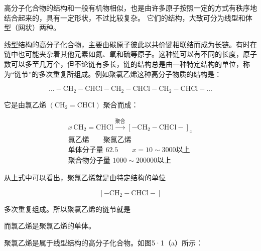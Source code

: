 高分子化合物的结构和一般有机物相似，也是由许多原子按照一定的方式有秩序地结合起来的，具有一定形状，不过比较复杂。
它们的结构，大致可分为线型和体型（网状）两种。

线型结构的高分子化合物，主要由碳原子彼此以共价键相联结而成为长链。有时在链中也可能夹杂着其他元素如氮、氧和硫等原子。这种链可以有不同的长度，原子数可以多至几万个，但不论链有多长，链的结构总是由一种特定结构的单位，称为``链节''的多次重复所组成。例如聚氯乙烯这种高分子物质的结构是：

\[
\dots-\mathrm{CH}_{2}-\mathrm{CHCl}-\mathrm{CH}_{2}-\mathrm{CHCl}-\mathrm{CH}_{2}-\mathrm{CHCl}-\dots
\]

它是由氯乙烯 \(\left(\mathrm{CH}_{2}=\mathrm{CHCl}\right)\) 聚合而成：

\[
\begin{array}{c}
x\,\mathrm{CH}_{2}=\mathrm{CHCl}\xrightarrow{\text{聚合}}[-\mathrm{CH}_{2}-\mathrm{CHCl}-]_{x}\\
\text{氯乙烯}\qquad\text{聚氯乙烯}\\
\text{单体分子量 }62.5\qquad x=10\sim3000\text{以上}\\
\text{聚合物分子量 }1000\sim200000\text{以上}
\end{array}
\]

从上式中可以看出，聚氯乙烯就是由特定结构的单位

\[
[-\mathrm{CH}_{2}-\mathrm{CHCl}-]
\]

多次重复组成。所以聚氯乙烯的链节就是

\begin{figure}
\centering
{}

\end{figure}

而氯乙烯是聚氯乙烯的单体。

聚氯乙烯是属于线型结构的高分子化合物。如图5·1（a）所示：

